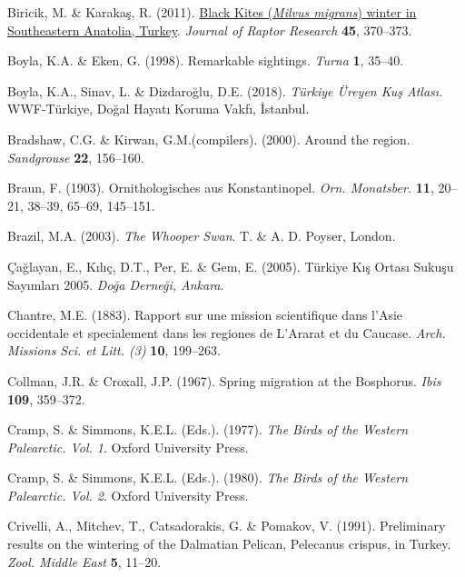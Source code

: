 \documentclass[
  a4paper,
  DIV=11,
  numbers=noendperiod]{scrreprt}
\newlength{\cslhangindent}
\newenvironment{CSLReferences}[2] %
 {\begin{list}{}{%
  \setlength{\itemindent}{0pt}
  \setlength{\leftmargin}{0pt}
  \setlength{\parsep}{0pt}
  \ifodd #1
   \setlength{\leftmargin}{\cslhangindent}
   \setlength{\itemindent}{-1\cslhangindent}
  \fi
  \setlength{\itemsep}{#2\baselineskip}}}
 {\end{list}}
\begin{document}
\begin{CSLReferences}{1}{1}
Biricik, M. \& Karakaş, R. (2011).
\href{https://doi.org/10.3356/JRR-10-109.1}{{Black Kites (\emph{Milvus
migrans}) winter in Southeastern Anatolia, Turkey}}. \emph{Journal of
Raptor Research} \textbf{45}, 370--373.

Boyla, K.A. \& Eken, G. (1998). {Remarkable sightings}. \emph{Turna}
\textbf{1}, 35--40.

Boyla, K.A., Sinav, L. \& Dizdaroğlu, D.E. (2018). \emph{{Türkiye Üreyen
Kuş Atlası}}. WWF-Türkiye, Doğal Hayatı Koruma Vakfı, İstanbul.

Bradshaw, C.G. \& Kirwan, G.M.(compilers). (2000). {Around the region}.
\emph{Sandgrouse} \textbf{22}, 156--160.

Braun, F. (1903). {Ornithologisches aus Konstantinopel}. \emph{Orn.
Monatsber.} \textbf{11}, 20--21, 38--39, 65--69, 145--151.

Brazil, M.A. (2003). \emph{{The Whooper Swan}}. T. \& A. D. Poyser,
London.

Çağlayan, E., Kılıç, D.T., Per, E. \& Gem, E. (2005). {Türkiye Kış
Ortası Sukuşu Sayımları 2005}. \emph{Doğa Derneği, Ankara}.

Chantre, M.E. (1883). {Rapport sur une mission scientifique dans l'Asie
occidentale et specialement dans les regiones de L'Ararat et du
Caucase}. \emph{Arch. Missions Sci. et Litt. (3)} \textbf{10}, 199--263.

Collman, J.R. \& Croxall, J.P. (1967). {Spring migration at the
Bosphorus}. \emph{Ibis} \textbf{109}, 359--372.

Cramp, S. \& Simmons, K.E.L. (Eds.). (1977). \emph{{The Birds of the
Western Palearctic. Vol. 1}}. Oxford University Press.

Cramp, S. \& Simmons, K.E.L. (Eds.). (1980). \emph{{The Birds of the
Western Palearctic. Vol. 2}}. Oxford University Press.

Crivelli, A., Mitchev, T., Catsadorakis, G. \& Pomakov, V. (1991).
{Preliminary results on the wintering of the Dalmatian Pelican,
Pelecanus crispus, in Turkey}. \emph{Zool. Middle East} \textbf{5},
11--20.


\end{CSLReferences}
\end{document}
